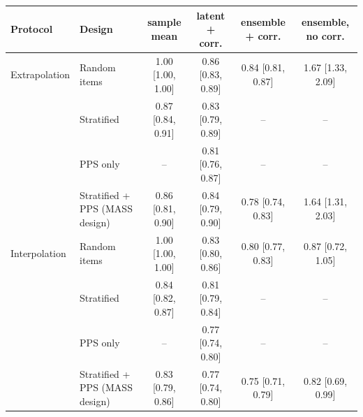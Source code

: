 \begin{tabular}{llcccc}
\toprule
Protocol & Design & sample mean & latent + corr. & ensemble + corr. & ensemble, no corr. \\
\midrule
Extrapolation & Random items & 1.00 [1.00, 1.00] & 0.86 [0.83, 0.89] & 0.84 [0.81, 0.87] & 1.67 [1.33, 2.09] \\
 & Stratified & 0.87 [0.84, 0.91] & 0.83 [0.79, 0.89] & -- & -- \\
 & PPS only & -- & 0.81 [0.76, 0.87] & -- & -- \\
 & Stratified + PPS (MASS design) & 0.86 [0.81, 0.90] & 0.84 [0.79, 0.90] & 0.78 [0.74, 0.83] & 1.64 [1.31, 2.03] \\
\midrule
Interpolation & Random items & 1.00 [1.00, 1.00] & 0.83 [0.80, 0.86] & 0.80 [0.77, 0.83] & 0.87 [0.72, 1.05] \\
 & Stratified & 0.84 [0.82, 0.87] & 0.81 [0.79, 0.84] & -- & -- \\
 & PPS only & -- & 0.77 [0.74, 0.80] & -- & -- \\
 & Stratified + PPS (MASS design) & 0.83 [0.79, 0.86] & 0.77 [0.74, 0.80] & 0.75 [0.71, 0.79] & 0.82 [0.69, 0.99] \\
\bottomrule
\end{tabular}
